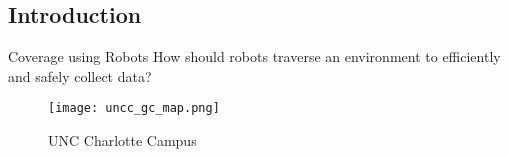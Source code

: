 \subsection{Introduction}

\begin{tcFrame}[0.5]{Coverage using Robots}
	\vspace{5em}
	\centering
	\Large How should robots traverse an environment to efficiently and safely collect data?
	\midtcframe[0.5]
	\centering
	\begin{figure}
		\texttt{[image: uncc\_gc\_map.png]}
		\caption{UNC Charlotte Campus}
	\end{figure}
\end{tcFrame}
